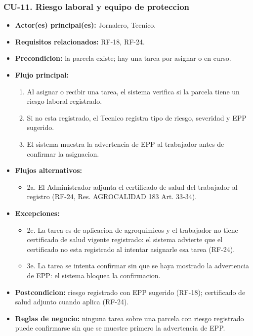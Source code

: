 \documentclass[11pt,a4paper]{article}
\begin{document}
\subsubsection{CU-11. Riesgo laboral y equipo de proteccion}
\begin{itemize}
\item \textbf{Actor(es) principal(es):} Jornalero, Tecnico.
\item \textbf{Requisitos relacionados:} RF-18, RF-24.
\item \textbf{Precondicion:} la parcela existe; hay una tarea por asignar o en curso.
\item \textbf{Flujo principal:}
  \begin{enumerate}
  \item Al asignar o recibir una tarea, el sistema verifica si la parcela tiene un riesgo laboral registrado.
  \item Si no esta registrado, el Tecnico registra tipo de riesgo, severidad y EPP sugerido.
  \item El sistema muestra la advertencia de EPP al trabajador antes de confirmar la asignacion.
  \end{enumerate}
\item \textbf{Flujos alternativos:}
  \begin{itemize}
  \item 2a. El Administrador adjunta el certificado de salud del trabajador al registro (RF-24, Res. AGROCALIDAD 183 Art. 33-34).
  \end{itemize}
\item \textbf{Excepciones:}
  \begin{itemize}
  \item 2e. La tarea es de aplicacion de agroquimicos y el trabajador no tiene certificado de salud vigente registrado: el sistema advierte que el certificado no esta registrado al intentar asignarle esa tarea (RF-24).
  \item 3e. La tarea se intenta confirmar sin que se haya mostrado la advertencia de EPP: el sistema bloquea la confirmacion.
  \end{itemize}
\item \textbf{Postcondicion:} riesgo registrado con EPP sugerido (RF-18); certificado de salud adjunto cuando aplica (RF-24).
\item \textbf{Reglas de negocio:} ninguna tarea sobre una parcela con riesgo registrado puede confirmarse sin que se muestre primero la advertencia de EPP.
\end{itemize}
\end{document}
